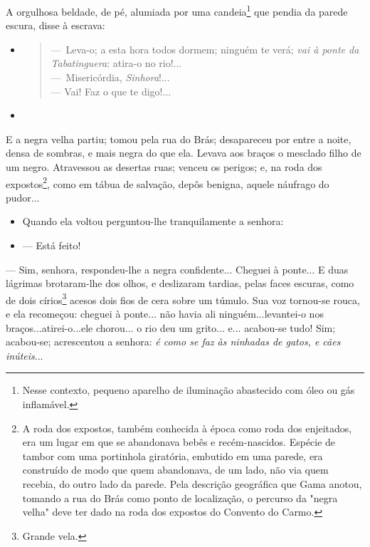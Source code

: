 A orgulhosa beldade, de pé, alumiada por uma candeia\footnote{Nesse
  contexto, pequeno aparelho de iluminação abastecido com óleo ou gás
  inflamável.} que pendia da parede escura, disse à escrava:

\begin{itemize}
\item
  \begin{quote}
  ---~Leva-o; a esta hora todos dormem; ninguém te verá; \emph{vai à
  ponte da Tabatinguera}: atira-o no rio!...\\
  ---~Misericórdia, \emph{Sinhora}!...\\
  --- Vai! Faz o que te digo!...
  \end{quote}
\item
\end{itemize}

E a negra velha partiu; tomou pela rua do Brás; desapareceu por entre a
noite, densa de sombras, e mais negra do que ela. Levava aos braços o
mesclado filho de um negro. Atravessou as desertas ruas; venceu os
perigos; e, na roda dos expostos\footnote{A roda dos expostos, também
  conhecida à época como roda dos enjeitados, era um lugar em que se
  abandonava bebês e recém-nascidos. Espécie de tambor com uma
  portinhola giratória, embutido em uma parede, era construído de modo
  que quem abandonava, de um lado, não via quem recebia, do outro lado
  da parede. Pela descrição geográfica que Gama anotou, tomando a rua do
  Brás como ponto de localização, o percurso da "negra velha" deve ter
  dado na roda dos expostos do Convento do Carmo.}, como em tábua de
salvação, depôs benigna, aquele náufrago do pudor...

\begin{itemize}
\item
  Quando ela voltou perguntou-lhe tranquilamente a senhora:
\item
  --- Está feito!
\end{itemize}

--- Sim, senhora, respondeu-lhe a negra confidente... Cheguei à
ponte... E duas lágrimas brotaram-lhe dos olhos, e deslizaram tardias,
pelas faces escuras, como de dois círios\footnote{Grande vela.} acesos
dois fios de cera sobre um túmulo. Sua voz tornou-se rouca, e ela
recomeçou: cheguei à ponte... não havia ali ninguém...levantei-o nos
braços...atirei-o...ele chorou... o rio deu um grito... e... acabou-se
tudo! Sim; acabou-se; acrescentou a senhora: \emph{é como se faz às
ninhadas de gatos, e cães inúteis}...

